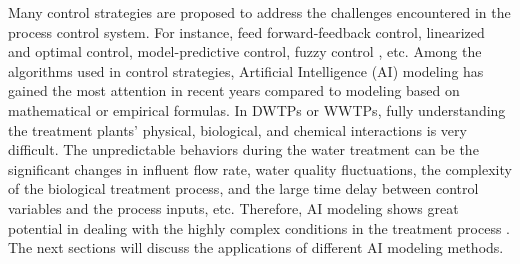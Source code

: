 Many control strategies are proposed to address the challenges encountered in the process control system. For instance, feed forward-feedback control, linearized and optimal control, model-predictive control, fuzzy control \citep{demirFeedbackControlChlorine2014a}, etc. Among the algorithms used in control strategies, Artificial Intelligence (AI) modeling has gained the most attention in recent years compared to modeling based on mathematical or empirical formulas. In DWTPs or WWTPs, fully understanding the treatment plants' physical, biological, and chemical interactions is very difficult. The unpredictable behaviors during the water treatment can be the significant changes in influent flow rate, water quality fluctuations, the complexity of the biological treatment process, and the large time delay between control variables and the process inputs, etc. Therefore, AI modeling shows great potential in dealing with the highly complex conditions in the treatment process \citep{liRecentAdvancesArtificial2021}. The next sections will discuss the applications of different AI modeling methods.

